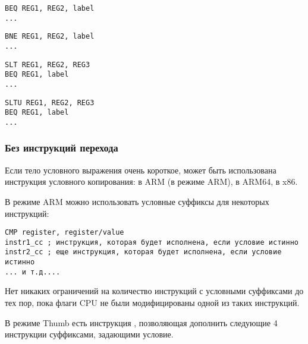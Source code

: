 \begin{lstlisting}[caption=Проверка на равенство,style=customasmMIPS]
BEQ REG1, REG2, label
...
\end{lstlisting}

\begin{lstlisting}[caption=Проверка на неравенство,style=customasmMIPS]
BNE REG1, REG2, label
...
\end{lstlisting}

\begin{lstlisting}[caption=Проверка на меньше{,} больше (знаковое),style=customasmMIPS]
SLT REG1, REG2, REG3
BEQ REG1, label
...
\end{lstlisting}

\begin{lstlisting}[caption=Проверка на меньше{,} больше (беззнаковое),style=customasmMIPS]
SLTU REG1, REG2, REG3
BEQ REG1, label
...
\end{lstlisting}

\subsubsection{Без инструкций перехода}


Если тело условного выражения очень короткое, может быть
использована инструкция условного копирования:  в ARM (в режиме ARM),  в ARM64,  в x86.


В режиме ARM можно использовать условные суффиксы для некоторых инструкций:

\begin{lstlisting}[caption=ARM (\ARMMode),style=customasmARM]
CMP register, register/value
instr1_cc ; инструкция, которая будет исполнена, если условие истинно
instr2_cc ; еще инструкция, которая будет исполнена, если условие истинно
... и т.д....
\end{lstlisting}

Нет никаких ограничений на количество инструкций с условными суффиксами до тех пор,
пока флаги CPU не были модифицированы одной из таких инструкций.


В режиме Thumb есть инструкция , позволяющая дополнить следующие 4 инструкции суффиксами, задающими
условие.

